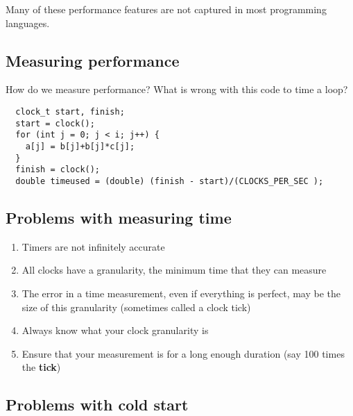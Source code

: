 \documentclass[%
oneside,                 %
final,                   %
10pt]{article}
\begin{document}
\noindent
Many of these  performance features are not captured in most programming languages.

\subsection*{Measuring performance}

How do we measure performance? What is wrong with this code to time a loop?








\begin{verbatim}
  clock_t start, finish;
  start = clock();
  for (int j = 0; j < i; j++) {
    a[j] = b[j]+b[j]*c[j];
  }
  finish = clock();
  double timeused = (double) (finish - start)/(CLOCKS_PER_SEC );

\end{verbatim}


\subsection*{Problems with measuring time}
\begin{enumerate}
\item Timers are not infinitely accurate

\item All clocks have a granularity, the minimum time that they can measure

\item The error in a time measurement, even if everything is perfect, may be the size of this granularity (sometimes called a clock tick)

\item Always know what your clock granularity is

\item Ensure that your measurement is for a long enough duration (say 100 times the \textbf{tick})
\end{enumerate}

\noindent
\subsection*{Problems with cold start}
\end{document}

